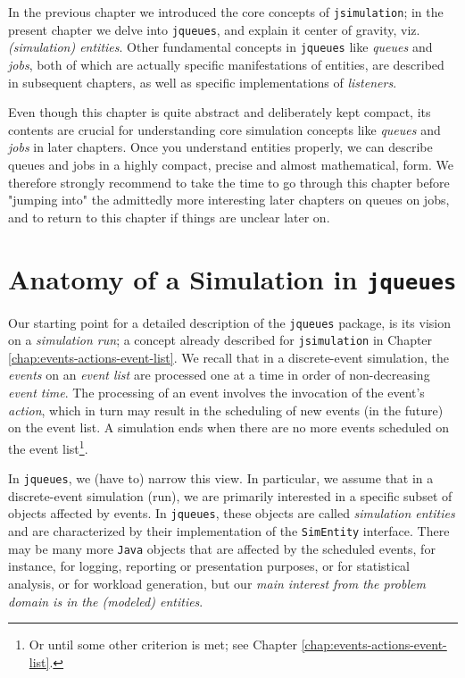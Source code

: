 In the previous chapter we introduced the
  core concepts of \lstinline|jsimulation|;
  in the present chapter we delve into \lstinline|jqueues|,
  and explain it center of gravity, viz. {\em (simulation) entities}.
Other fundamental concepts in \lstinline|jqueues|
  like {\em queues\/} and {\em jobs\/},
  both of which are actually specific manifestations of entities,
  are described in subsequent chapters,
  as well as specific implementations of {\em listeners}.
  
Even though this chapter
  is quite abstract
  and deliberately kept compact,
  its contents are crucial for understanding
  core simulation concepts
  like {\em queues\/} and {\em jobs\/}
  in later chapters.
Once you understand entities properly,
  we can describe queues and jobs
  in a highly compact,
  precise and almost mathematical, form.
We therefore strongly recommend to take the time
  to go through this chapter before "jumping into"
  the admittedly more interesting later
  chapters on queues on jobs,
  and to return to this chapter
  if things are unclear later on.
  
\section{Anatomy of a Simulation in \texttt{\bf jqueues}}

Our starting point for a detailed description
  of the \lstinline|jqueues| package,
  is its vision on a {\em simulation run\/};
  a concept already described for \lstinline|jsimulation|
  in Chapter \ref{chap:events-actions-event-list}.
We recall that in a discrete-event simulation,
  the {\em events\/} on an {\em event list\/}
  are processed one at a time
  in order of non-decreasing {\em event time}.
The processing of an event
  involves the invocation of the event's {\em action},
  which in turn may result in the scheduling of new
  events (in the future) on the event list.
A simulation ends when there are no more
  events scheduled on the event list\footnote{
  Or until some other criterion is met;
  see Chapter \ref{chap:events-actions-event-list}.}.

In \lstinline|jqueues|,
  we (have to) narrow this view.
In particular,
  we assume that in a discrete-event simulation (run),
  we are primarily interested in
  a specific subset of objects affected by events.
In \lstinline|jqueues|,
  these objects are called {\em simulation entities}
  and are characterized
  by their implementation of the \lstinline|SimEntity| interface.
There may be many more \lstinline|Java| objects
  that are affected by the scheduled events,
  for instance,
  for logging, reporting or presentation purposes,
  or for statistical analysis,
  or for workload generation,
  but our
  {\em main interest from the problem domain is in the (modeled) entities}.

